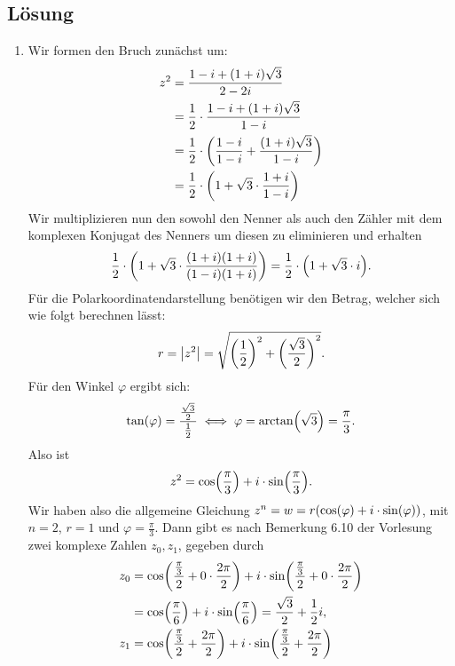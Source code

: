 \documentclass[german,12pt]{homework}
\DeclarePairedDelimiter{\absolute}{\lvert}{\rvert}
\DeclarePairedDelimiter{\enbrace}{(}{)}
\begin{document}
    \subsection*{Lösung}
    \begin{enumerate}
        \item Wir formen den Bruch zunächst um:
        \begin{align*}
            z^2 &= \frac{1 - i + \enbrace*{1 + i}\sqrt{3}}{2 - 2i}\\
            &= \frac{1}{2} \cdot \frac{1 - i + \enbrace*{1 + i}\sqrt{3}}{1 - i}\\
            &= \frac{1}{2} \cdot \enbrace*{\frac{1 - i}{1 - i} + \frac{\enbrace*{1 + i}\sqrt{3}}{1 - i}}\\
            &= \frac{1}{2} \cdot \enbrace*{1 + \sqrt{3} \cdot \frac{1 + i}{1 - i}}
        \end{align*}
        Wir multiplizieren nun den sowohl den Nenner als auch den Zähler mit dem komplexen Konjugat des Nenners um diesen zu eliminieren und erhalten
        \[\frac{1}{2} \cdot \enbrace*{1 + \sqrt{3} \cdot \frac{\enbrace*{1 + i}\enbrace*{1 + i}}{\enbrace*{1 - i}\enbrace*{1 + i}}} = \frac{1}{2} \cdot \enbrace*{1 + \sqrt{3} \cdot i}.\]
        Für die Polarkoordinatendarstellung benötigen wir den Betrag, welcher sich wie folgt berechnen lässt:
        \[r = \absolute*{z^2} = \sqrt{\enbrace*{\frac{1}{2}}^2 + \enbrace*{\frac{\sqrt{3}}{2}}^2}.\]
        Für den Winkel \(\varphi\) ergibt sich:
        \[\tan\enbrace*{\varphi} = \frac{\frac{\sqrt{3}}{2}}{\frac{1}{2}} \iff \varphi = \arctan\enbrace*{\sqrt{3}} = \frac{\pi}{3}.\]
        Also ist
        \[z^2 = \cos\enbrace*{\frac{\pi}{3}} + i \cdot \sin\enbrace*{\frac{\pi}{3}}.\]
        Wir haben also die allgemeine Gleichung \(z^n = w = r\enbrace*{\cos\enbrace*{\varphi} + i \cdot \sin\enbrace*{\varphi}}\), mit \(n = 2\), \(r = 1\) und \(\varphi = \frac{\pi}{3}\). Dann gibt es nach Bemerkung 6.10 der Vorlesung zwei komplexe Zahlen \(z_0, z_1\), gegeben durch
        \begin{align*}
            z_0 &= \cos\enbrace*{\frac{\frac{\pi}{3}}{2} + 0 \cdot \frac{2\pi}{2}} + i \cdot \sin\enbrace*{\frac{\frac{\pi}{3}}{2} + 0 \cdot \frac{2\pi}{2}}\\
            &= \cos\enbrace*{\frac{\pi}{6}} + i \cdot \sin\enbrace*{\frac{\pi}{6}} = \frac{\sqrt{3}}{2} + \frac{1}{2}i,\\
            z_1 &= \cos\enbrace*{\frac{\frac{\pi}{3}}{2} + \frac{2\pi}{2}} + i \cdot \sin\enbrace*{\frac{\frac{\pi}{3}}{2} + \frac{2\pi}{2}}\\

\end{align*}
\end{enumerate}
\end{document}
